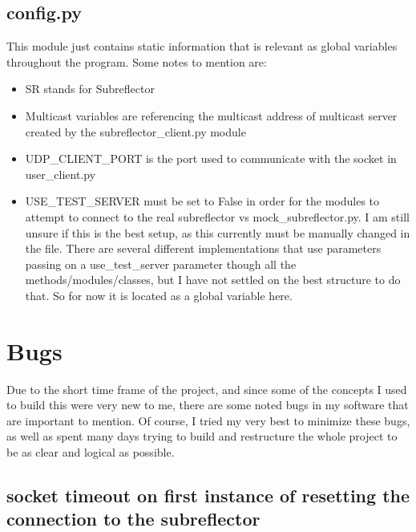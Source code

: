 \documentclass{article}
\begin{document}
\newpage
\subsection{config.py}

This module just contains static information that is relevant as global variables throughout the program. Some notes to mention are:

\begin{itemize}
\item  SR stands for Subreflector
\item Multicast variables are referencing the multicast address of multicast server created by the subreflector\_client.py module
\item UDP\_CLIENT\_PORT is the port used to communicate with the socket in user\_client.py
\item USE\_TEST\_SERVER must be set to False in order for the modules to attempt to connect to the real subreflector vs mock\_subreflector.py. I am still unsure if this is the best setup, as this currently must be manually changed in the file. There are several different implementations that use parameters passing on a use\_test\_server parameter though all the methods/modules/classes, but I have not settled on the best structure to do that. So for now it is located as a global variable here. 
\end{itemize}










\newpage
\section{Bugs}

Due to the short time frame of the project, and since some of the concepts I used to build this were very new to me, there are some noted bugs in my software that are important to mention. Of course, I tried my very best to minimize these bugs, as well as spent many days trying to build and restructure the whole project to be as clear and logical as possible.  

\subsection{socket timeout on first instance of resetting the connection to the subreflector }
\end{document}
